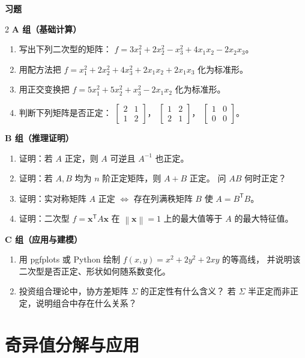 \documentclass[11pt,a4paper,openany]{ctexbook}
\newcommand{\norm}[1]{\left\lVert #1 \right\rVert}
\newcommand{\exhead}{%
  \par\addvspace{12pt}%
  {\noindent\sffamily\bfseries\Large\color{qing} 习题\par}%
  \vspace{-4pt}\noindent{\color{qing!32}\rule{\linewidth}{0.7pt}}\par\vspace{6pt}}
\begin{document}
\exhead
\begin{multicols}{2}
\small
\textbf{A 组（基础计算）}
\begin{enumerate}[leftmargin=1.6em, itemsep=3pt]
\item 写出下列二次型的矩阵：
      $f=3x_1^2+2x_2^2-x_3^2+4x_1x_2-2x_2x_3$。
\item 用配方法把 $f=x_1^2+2x_2^2+4x_3^2+2x_1x_2+2x_1x_3$ 化为标准形。
\item 用正交变换把 $f=5x_1^2+5x_2^2+x_3^2-2x_1x_2$ 化为标准形。
\item 判断下列矩阵是否正定：
      $\begin{bmatrix}2&1\\1&2\end{bmatrix}$，
      $\begin{bmatrix}1&2\\2&1\end{bmatrix}$，
      $\begin{bmatrix}1&0\\0&0\end{bmatrix}$。
\end{enumerate}
\textbf{B 组（推理证明）}
\begin{enumerate}[leftmargin=1.6em, itemsep=3pt, start=5]
\item 证明：若 $A$ 正定，则 $A$ 可逆且 $A^{-1}$ 也正定。
\item 证明：若 $A,B$ 均为 $n$ 阶正定矩阵，则 $A+B$ 正定。
      问 $AB$ 何时正定？
\item 证明：实对称矩阵 $A$ 正定 $\Leftrightarrow$ 存在列满秩矩阵 $B$ 使 $A=B^{\mathsf T}B$。
\item 证明：二次型 $f=\boldsymbol{x}^{\mathsf T}A\boldsymbol{x}$ 在
      $\norm{\boldsymbol{x}}=1$ 上的最大值等于 $A$ 的最大特征值。
\end{enumerate}
\textbf{C 组（应用与建模）}
\begin{enumerate}[leftmargin=1.6em, itemsep=3pt, start=9]
\item 用 pgfplots 或 Python 绘制
      $f(x,y)=x^2+2y^2+2xy$ 的等高线，
      并说明该二次型是否正定、形状如何随系数变化。
\item 投资组合理论中，协方差矩阵 $\Sigma$ 的正定性有什么含义？
      若 $\Sigma$ 半正定而非正定，说明组合中存在什么关系？
\end{enumerate}
\end{multicols}

\chapter{奇异值分解与应用}
\label{ch:svd}
\end{document}
